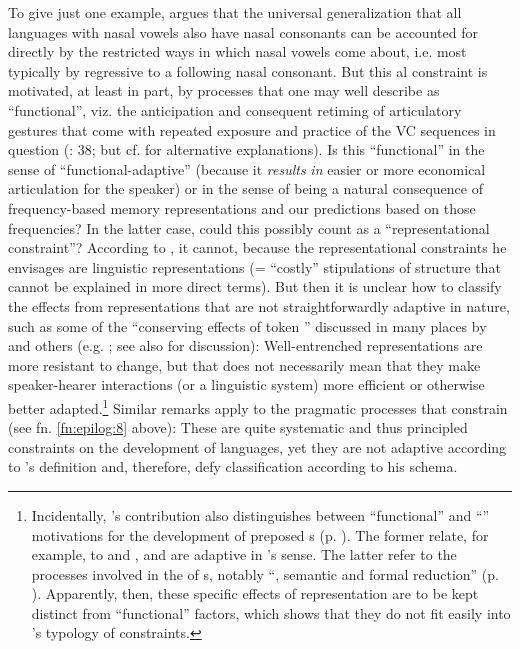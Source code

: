 \documentclass[output=paper]{langsci/langscibook}
\begin{document}
To give just one example,  argues that the universal generalization that all languages with nasal vowels also have nasal consonants can be accounted for directly by the restricted ways in which nasal vowels come about, i.e. most typically by regressive  to a following nasal consonant. But this al constraint is motivated, at least in part, by processes that one may well describe as “functional”, viz. the anticipation and consequent retiming of articulatory gestures that come with repeated exposure and practice of the VC sequences in question (\citealt{Bybee2015}: 38; but cf. \citealt{Ohala1989,Ohala2003} for alternative explanations). Is this “functional” in the sense of “functional-adaptive” (because it \textit{results} \textit{in} easier or more economical articulation for the speaker) or in the sense of being a natural consequence of frequency-based memory representations and our predictions based on those frequencies? In the latter case, could this possibly count as a “representational constraint”? According to , it cannot, because the representational constraints he envisages are  linguistic representations (= “costly” stipulations of structure that cannot be explained in more direct terms). But then it is unclear how to classify the  effects from  representations that are not straightforwardly adaptive in nature, such as some of the “conserving effects of token ” discussed in many places by  and others (e.g. \citealt{BybeeThompson1997,Pierrehumbert2001,Bybee2001}; see also \citealt{Cristofaro2015} for discussion): Well-entrenched representations are more resistant to change, but that does not necessarily mean that they make speaker-hearer interactions (or a linguistic system) more efficient or otherwise better adapted.\footnote{Incidentally, ’s contribution also distinguishes between “functional” and “” motivations for the development of preposed s (p. \pageref{p:diessel:preposedadverbialclauses}). The former relate, for example, to  and , and are adaptive in ’s sense. The latter refer to the  processes involved in the  of s, notably “, semantic  and formal reduction” (p. \pageref{p:xxx:automatization}). Apparently, then, these specific effects of  representation are to be kept distinct from “functional” factors, which shows that they do not fit easily into ’s typology of constraints.}  Similar remarks apply to the pragmatic processes that constrain  (see fn. \ref{fn:epilog:8} above): These are quite systematic and thus principled constraints on the development of languages, yet they are not adaptive according to ’s definition and, therefore, defy classification according to his schema.
\end{document}
